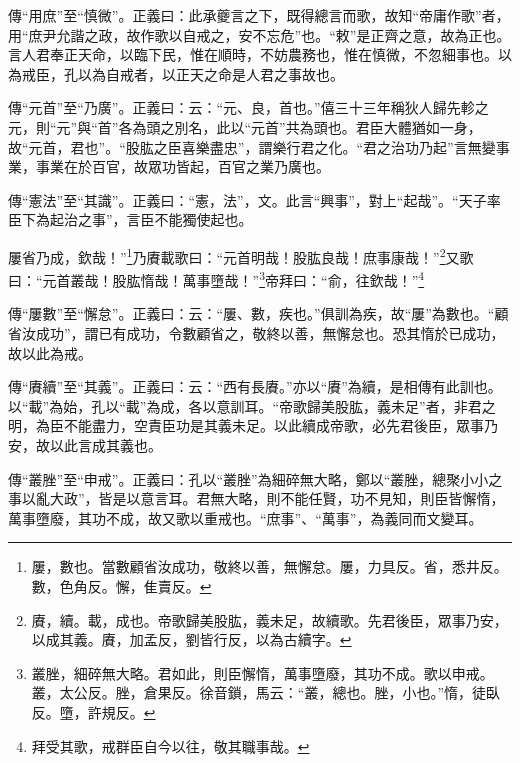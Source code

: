 {\noindent\zhuan{}\fzbyks 傳“用庶”至“慎微”。正義曰：此承夔言之下，既得總言而歌，故知“帝庸作歌”者，用“庶尹允諧之政，故作歌以自戒之，安不忘危”也。“敕”是正齊之意，故為正也。言人君奉正天命，以臨下民，惟在順時，不妨農務也，惟在慎微，不忽細事也。以為戒臣，孔以為自戒者，以正天之命是人君之事故也。 \par}

{\noindent\zhuan{}\fzbyks 傳“元首”至“乃廣”。正義曰：云：“元、良，首也。”僖三十三年稱狄人歸先軫之元，則“元”與“首”各為頭之別名，此以“元首”共為頭也。君臣大體猶如一身，故“元首，君也”。“股肱之臣喜樂盡忠”，謂樂行君之化。“君之治功乃起”言無變事業，事業在於百官，故眾功皆起，百官之業乃廣也。 \par}

{\noindent\zhuan{}\fzbyks 傳“憲法”至“其識”。正義曰：“憲，法”，文。此言“興事”，對上“起哉”。“天子率臣下為起治之事”，言臣不能獨使起也。 \par}

屢省乃成，欽哉！”\footnote{屢，數也。當數顧省汝成功，敬終以善，無懈怠。屢，力具反。省，悉井反。數，色角反。懈，隹賣反。}乃賡載歌曰：“元首明哉！股肱良哉！庶事康哉！”\footnote{賡，續。載，成也。帝歌歸美股肱，義未足，故續歌。先君後臣，眾事乃安，以成其義。賡，加孟反，劉皆行反，以為古續字。}又歌曰：“元首叢哉！股肱惰哉！萬事墮哉！”\footnote{叢脞，細碎無大略。君如此，則臣懈惰，萬事墮廢，其功不成。歌以申戒。叢，太公反。脞，倉果反。徐音鎖，馬云：“叢，總也。脞，小也。”惰，徒臥反。墮，許規反。}帝拜曰：“俞，往欽哉！”\footnote{拜受其歌，戒群臣自今以往，敬其職事哉。}

{\noindent\zhuan{}\fzbyks 傳“屢數”至“懈怠”。正義曰：云：“屢、數，疾也。”俱訓為疾，故“屢”為數也。“顧省汝成功”，謂已有成功，令數顧省之，敬終以善，無懈怠也。恐其惰於已成功，故以此為戒。 \par}

{\noindent\zhuan{}\fzbyks 傳“賡續”至“其義”。正義曰：云：“西有長賡。”亦以“賡”為續，是相傳有此訓也。以“載”為始，孔以“載”為成，各以意訓耳。“帝歌歸美股肱，義未足”者，非君之明，為臣不能盡力，空責臣功是其義未足。以此續成帝歌，必先君後臣，眾事乃安，故以此言成其義也。 \par}

{\noindent\zhuan{}\fzbyks 傳“叢脞”至“申戒”。正義曰：孔以“叢脞”為細碎無大略，鄭以“叢脞，總聚小小之事以亂大政”，皆是以意言耳。君無大略，則不能任賢，功不見知，則臣皆懈惰，萬事墮廢，其功不成，故又歌以重戒也。“庶事”、“萬事”，為義同而文變耳。 \par}

